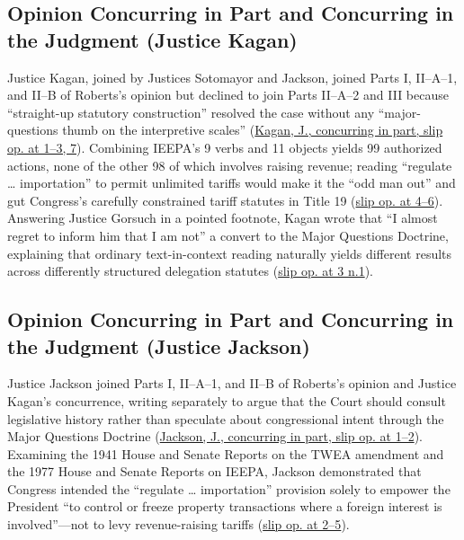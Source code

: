 \documentclass[12pt]{article}
\begin{document}
\subsection{Opinion Concurring in Part and Concurring in the Judgment (Justice Kagan)}
Justice Kagan, joined by Justices Sotomayor and Jackson, joined Parts I, II--A--1, and II--B of Roberts's opinion but declined to join Parts II--A--2 and III because ``straight-up statutory construction'' resolved the case without any ``major-questions thumb on the interpretive scales'' (\href{https://www.law.cornell.edu/supremecourt/text/24-1287}{Kagan, J., concurring in part, slip op. at 1--3, 7}). Combining IEEPA's 9 verbs and 11 objects yields 99 authorized actions, none of the other 98 of which involves raising revenue; reading ``regulate \ldots{} importation'' to permit unlimited tariffs would make it the ``odd man out'' and gut Congress's carefully constrained tariff statutes in Title 19 (\href{https://www.law.cornell.edu/supremecourt/text/24-1287}{slip op. at 4--6}). Answering Justice Gorsuch in a pointed footnote, Kagan wrote that ``I almost regret to inform him that I am not'' a convert to the Major Questions Doctrine, explaining that ordinary text-in-context reading naturally yields different results across differently structured delegation statutes (\href{https://www.law.cornell.edu/supremecourt/text/24-1287}{slip op. at 3 n.1}).

\subsection{Opinion Concurring in Part and Concurring in the Judgment (Justice Jackson)}
Justice Jackson joined Parts I, II--A--1, and II--B of Roberts's opinion and Justice Kagan's concurrence, writing separately to argue that the Court should consult legislative history rather than speculate about congressional intent through the Major Questions Doctrine (\href{https://www.law.cornell.edu/supremecourt/text/24-1287}{Jackson, J., concurring in part, slip op. at 1--2}). Examining the 1941 House and Senate Reports on the TWEA amendment and the 1977 House and Senate Reports on IEEPA, Jackson demonstrated that Congress intended the ``regulate \ldots{} importation'' provision solely to empower the President ``to control or freeze property transactions where a foreign interest is involved''---not to levy revenue-raising tariffs (\href{https://www.law.cornell.edu/supremecourt/text/24-1287}{slip op. at 2--5}).
\end{document}
